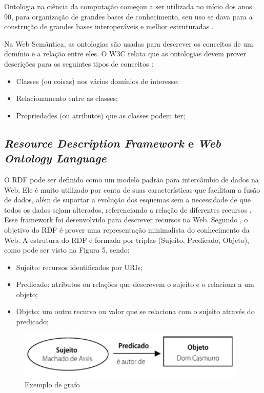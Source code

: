         Ontologia na ciência da computação começou a ser utilizada no início dos anos 90, para organização de grandes bases de conhecimento, seu uso se dava para a construção de grandes bases interoperáveis e melhor estruturadas \cite{MOREIRA2004}. 
        
        Na Web Semântica, as ontologias são usadas para descrever os conceitos de um domínio e a relação entre eles. O W3C relata que as ontologias devem prover descrições para os seguintes tipos de conceitos \cite{breitman2005web}:
        
        \begin{itemize}
    	\item  Classes (ou coisas) nos vários domínios de interesse;
        \item  Relacionamento entre as classes;
        \item  Propriedades (ou atributos) que as classes podem ter; 
        \end{itemize}
        
   
	\subsection{\textit{Resource Description Framework} e \textit{Web Ontology Language}}
    
    	O RDF pode ser definido como um modelo padrão para intercâmbio de dados na Web. Ele é muito utilizado por conta de suas características que facilitam a fusão de dados, além de suportar a evolução dos esquemas sem a necessidade de que todos os dados sejam alterados, referenciando a relação de diferentes recursos \cite{W3C2014}.
    	Esse framework foi desenvolvido para descrever recursos na Web. Segundo , o objetivo do RDF é prover uma representação minimalista do conhecimento da Web.
    	A estrutura do RDF é formada por triplas (Sujeito, Predicado, Objeto), como pode ser visto na Figura 5, sendo:
    	
        \begin{itemize}
        	\item Sujeito: recursos  identificados por URIs;
            \item Predicado: atributos ou relações que descrevem o sujeito e o relaciona a um objeto;
            \item Objeto: um outro recurso ou valor que se relaciona com o sujeito através do predicado;
        \end{itemize}
        
         \begin{figure}[htbp]
        	\centering
            \caption{Exemplo de grafo}
            \label{fig:owl2-profiles}
            \includegraphics[width=0.7\linewidth]{images/exemplo-tripla.png}
        \end{figure}
    	
